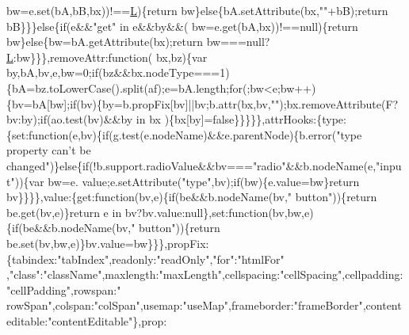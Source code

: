 \begin{DoxyCode}
      bw=e.set(bA,bB,bx))!==\hyperlink{jquery_8js_a38ee4c0b5f4fe2a18d0c783af540d253}{L})\{\textcolor{keywordflow}{return} bw\}\textcolor{keywordflow}{else}\{bA.setAttribute(bx,\textcolor{stringliteral}{""}+bB);\textcolor{keywordflow}{return} bB\}\}\}\textcolor{keywordflow}{else}\{\textcolor{keywordflow}{if}(e&&\textcolor{stringliteral}{"get"} in e&&by&&(
      bw=e.get(bA,bx))!==null)\{\textcolor{keywordflow}{return} bw\}\textcolor{keywordflow}{else}\{bw=bA.getAttribute(bx);\textcolor{keywordflow}{return} bw===null?\hyperlink{jquery_8js_a38ee4c0b5f4fe2a18d0c783af540d253}{L}:bw\}\}\},removeAttr:\textcolor{keyword}{function}(
      bx,bz)\{var by,bA,bv,e,bw=0;\textcolor{keywordflow}{if}(bz&&bx.nodeType===1)\{bA=bz.toLowerCase().split(af);e=bA.length;\textcolor{keywordflow}{for}(;bw<e;bw++)
      \{bv=bA[bw];\textcolor{keywordflow}{if}(bv)\{by=b.propFix[bv]||bv;b.attr(bx,bv,\textcolor{stringliteral}{""});bx.removeAttribute(F?bv:by);\textcolor{keywordflow}{if}(ao.test(bv)&&by in bx
      )\{bx[by]=\textcolor{keyword}{false}\}\}\}\}\},attrHooks:\{type:\{set:\textcolor{keyword}{function}(e,bv)\{\textcolor{keywordflow}{if}(g.test(e.nodeName)&&e.parentNode)\{b.error(\textcolor{stringliteral}{"type
       property can't be changed"})\}\textcolor{keywordflow}{else}\{\textcolor{keywordflow}{if}(!b.support.radioValue&&bv===\textcolor{stringliteral}{"radio"}&&b.nodeName(e,\textcolor{stringliteral}{"input"}))\{var bw=e.
      value;e.setAttribute(\textcolor{stringliteral}{"type"},bv);\textcolor{keywordflow}{if}(bw)\{e.value=bw\}\textcolor{keywordflow}{return} bv\}\}\}\},value:\{\textcolor{keyword}{get}:\textcolor{keyword}{function}(bv,e)\{\textcolor{keywordflow}{if}(be&&b.nodeName(bv,\textcolor{stringliteral}{"
      button"}))\{\textcolor{keywordflow}{return} be.get(bv,e)\}\textcolor{keywordflow}{return} e in bv?bv.value:null\},set:\textcolor{keyword}{function}(bv,bw,e)\{\textcolor{keywordflow}{if}(be&&b.nodeName(bv,\textcolor{stringliteral}{"
      button"}))\{\textcolor{keywordflow}{return} be.set(bv,bw,e)\}bv.value=bw\}\}\},propFix:\{tabindex:\textcolor{stringliteral}{"tabIndex"},readonly:\textcolor{stringliteral}{"readOnly"},\textcolor{stringliteral}{"for"}:\textcolor{stringliteral}{"htmlFor"}
      ,\textcolor{stringliteral}{"class"}:\textcolor{stringliteral}{"className"},maxlength:\textcolor{stringliteral}{"maxLength"},cellspacing:\textcolor{stringliteral}{"cellSpacing"},cellpadding:\textcolor{stringliteral}{"cellPadding"},rowspan:\textcolor{stringliteral}{"
      rowSpan"},colspan:\textcolor{stringliteral}{"colSpan"},usemap:\textcolor{stringliteral}{"useMap"},frameborder:\textcolor{stringliteral}{"frameBorder"},contenteditable:\textcolor{stringliteral}{"contentEditable"}\},prop:\textcolor{keyword}{
}
\end{DoxyCode}
